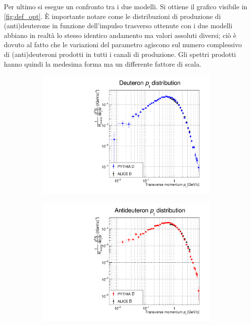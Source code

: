 Per ultimo si esegue un confronto tra i due modelli.
Si ottiene il grafico visibile in \autoref{fig:def_opt}.
È importante notare come le distribuzioni di produzione di (anti)deuterone in funzione dell'impulso trasverso ottenute con i due modelli abbiano in realtà lo stesso identico andamento ma valori assoluti diversi; ciò è dovuto al fatto che le variazioni del parametro  agiscono sul numero complessivo di (anti)deuteroni prodotti in tutti i canali di produzione.
Gli spettri prodotti hanno quindi la medesima forma ma un differente fattore di scala.
\begin{figure}[htp]
    \centering
    \begin{subfigure}{.49\textwidth}
    \centering
        \includegraphics[width=\textwidth]{image/3-risultati/analyse/G/deuteron.pdf}
        \caption{}
        \label{fig:D_deuteron}
    \end{subfigure}
    \begin{subfigure}{.49\textwidth}
        \centering
        \includegraphics[width=\textwidth]{image/3-risultati/analyse/G/antideuteron.pdf}
        \caption{}
        \label{fig:D_antideuteron}
    \end{subfigure}
    \label{fig:D_(anti)deuteron}
\end{figure}
